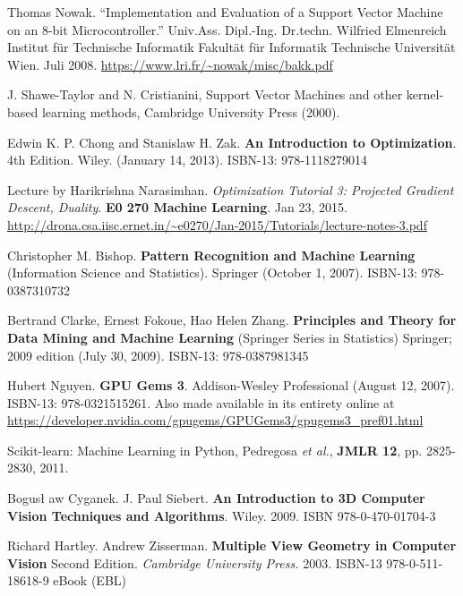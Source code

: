 \documentclass[10pt]{amsart}
\begin{document}
\begin{thebibliography}{9}
Thomas Nowak.  ``Implementation and Evaluation of a Support Vector Machine on an 8-bit Microcontroller.''  Univ.Ass. Dipl.-Ing. Dr.techn. Wilfried Elmenreich Institut f\"{u}r Technische Informatik Fakult\"{a}t f\"{u}r Informatik Technische Universit\"{a}t Wien.  Juli 2008.  \url{https://www.lri.fr/~nowak/misc/bakk.pdf}



J.  Shawe-Taylor  and  N.  Cristianini,  Support  Vector  Machines  and  other  kernel-based  learning  methods,
Cambridge University Press (2000).



Edwin K. P. Chong and Stanislaw H. Zak.  \textbf{An Introduction to Optimization}.  4th Edition.  Wiley.  (January 14, 2013).  ISBN-13: 978-1118279014
  
Lecture by Harikrishna Narasimhan.  \emph{Optimization Tutorial 3: Projected Gradient Descent, Duality}.  \textbf{E0 270 Machine Learning}.  Jan 23, 2015.  \url{http://drona.csa.iisc.ernet.in/~e0270/Jan-2015/Tutorials/lecture-notes-3.pdf}

Christopher M. Bishop.  \textbf{Pattern Recognition and Machine Learning} (Information Science and Statistics).  Springer (October 1, 2007).  ISBN-13: 978-0387310732


Bertrand Clarke, Ernest Fokoue, Hao Helen Zhang.   \textbf{Principles and Theory for Data Mining and Machine Learning} (Springer Series in Statistics)  Springer; 2009 edition (July 30, 2009).  ISBN-13: 978-0387981345
 

Hubert Nguyen. \textbf{GPU Gems 3}.  Addison-Wesley Professional (August 12, 2007).  ISBN-13: 978-0321515261.  Also made available in its entirety online at \url{https://developer.nvidia.com/gpugems/GPUGems3/gpugems3_pref01.html}

  Scikit-learn: Machine Learning in Python, Pedregosa \emph{et al.}, \textbf{JMLR 12}, pp. 2825-2830, 2011.


Bogus\l{} aw Cyganek.  J. Paul Siebert.  \textbf{An Introduction to 3D Computer Vision Techniques and Algorithms}.  Wiley.  2009.  ISBN 978-0-470-01704-3

Richard Hartley.  Andrew Zisserman.  \textbf{Multiple View Geometry in Computer Vision}  Second Edition.  \emph{Cambridge University Press.}  2003.  ISBN-13 978-0-511-18618-9 eBook (EBL)


\end{thebibliography}
\end{document}
